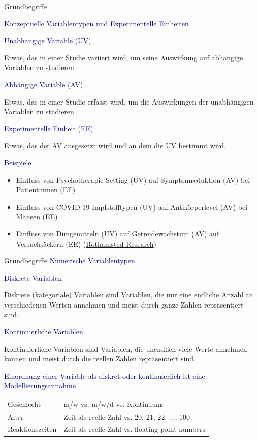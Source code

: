 \documentclass[
  8pt,
  ignorenonframetext,
]{beamer}
\providecommand{\tightlist}{%
  \setlength{\itemsep}{0pt}\setlength{\parskip}{0pt}}
\begin{document}
\begin{frame}{Grundbegriffe}
\protect\hypertarget{grundbegriffe-1}{}

\textcolor{darkblue}{Konzeptuelle Variablentypen und Experimentelle Einheiten}

\small

\textcolor{darkblue}{Unabhängige Variable (UV)}

Etwas, das in einer Studie variiert wird, um seine Auswirkung auf
abhängige Variablen zu studieren.

\textcolor{darkblue}{Abhängige Variable (AV)}

Etwas, das in einer Studie erfasst wird, um die Auswirkungen der
unabhängigen Variablen zu studieren.

\textcolor{darkblue}{Experimentelle Einheit (EE)}

Etwas, das der AV ausgesetzt wird und an dem die UV bestimmt wird.

\textcolor{darkblue}{Beispiele}

\footnotesize

\begin{itemize}
\tightlist
\item
  Einfluss von Psychotherapie Setting (UV) auf Symptomreduktion (AV) bei
  Patient:innen (EE)
\item
  Einfluss von COVID-19 Impfstofftypen (UV) auf Antikörperlevel (AV) bei
  Mäusen (EE)
\item
  Einfluss von Düngemitteln (UV) auf Getreidewachstum (AV) auf
  Versuchsäckern (EE)
  (\href{https://en.wikipedia.org/wiki/Rothamsted_Research}{Rothamsted
  Research})
\end{itemize}
\end{frame}

\begin{frame}{Grundbegriffe}
\protect\hypertarget{grundbegriffe-2}{}
\textcolor{darkblue}{Numerische Variablentypen} \small

\textcolor{darkblue}{Diskrete Variablen}

Diskrete (kategoriale) Variablen sind Variablen, die nur eine endliche
Anzahl an verschiedenen Werten annehmen und meist durch ganze Zahlen
repräsentiert sind. \vspace{3mm}

\textcolor{darkblue}{Kontinuierliche Variablen}

Kontinuierliche Variablen sind Variablen, die unendlich viele Werte
annehmen können und meist durch die reellen Zahlen repräsentiert sind.
\vspace{3mm}

\textcolor{darkblue}{Einordnung einer Variable als diskret oder kontinuierlich ist eine Modellierungsannahme}

\center
\begin{tabular}{ll}
Geschlecht        & m/w vs. m/w/d vs. Kontinuum                       \\
Alter             & Zeit als reelle Zahl vs. 20, 21, 22, ..., 100      \\
Reaktionszeiten   & Zeit als reelle Zahl vs. floating point numbers
\end{tabular}
\end{frame}
\end{document}
